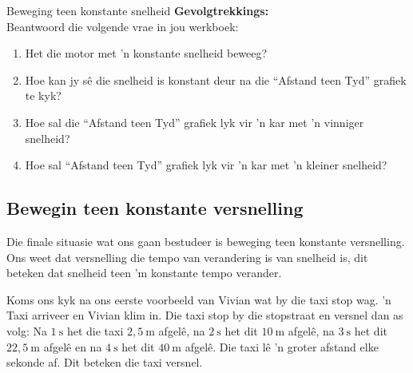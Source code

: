 \begin{g_experiment}{Beweging teen konstante snelheid}
\textbf{Gevolgtrekkings:}\\
Beantwoord die volgende vrae in jou werkboek:
\begin{enumerate}[noitemsep, label=\textbf{\arabic*}. ] 
    \item Het die motor met 'n konstante snelheid beweeg?
    \item Hoe kan jy s\^e die snelheid is konstant deur na die ``Afstand teen Tyd'' grafiek te kyk?
    \item Hoe sal die ``Afstand teen Tyd'' grafiek lyk vir 'n kar met 'n vinniger snelheid?
    \item Hoe sal ``Afstand teen Tyd'' grafiek lyk vir 'n kar met 'n kleiner snelheid?
\end{enumerate}
\end{g_experiment}
        \par 


\subsection*{Bewegin teen konstante versnelling}
            \nopagebreak
Die finale situasie wat ons gaan bestudeer is beweging teen konstante versnelling. Ons weet dat versnelling die tempo van verandering is van snelheid is, dit beteken dat snelheid teen 'm konstante tempo verander.\par 
        
Koms ons kyk na ons eerste voorbeeld van Vivian wat by die taxi stop wag. 'n Taxi arriveer en Vivian klim in. Die taxi stop by die stopstraat en versnel dan as volg: Na $1~\text{s}$ het die taxi $2,5~\text{m}$ afgel\^e, na $2~\text{s}$ het dit $10~\text{m}$ afgel\^e, na $3~\text{s}$ het dit $22,5~\text{m}$ afgel\^e en na $4~\text{s}$ het dit $40~\text{m}$ afgel\^e. Die taxi l\^e 'n groter afstand elke sekonde af. Dit beteken die taxi versnel.\par 

